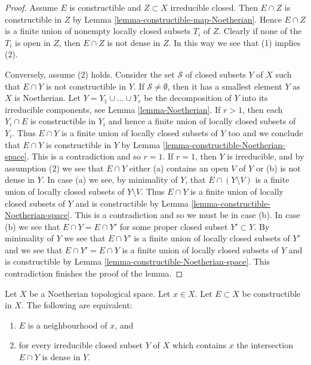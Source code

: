 \begin{proof}
Assume $E$ is constructible and $Z \subset X$ irreducible closed.
Then $E \cap Z$ is constructible in $Z$ by
Lemma \ref{lemma-constructible-map-Noetherian}.
Hence $E \cap Z$ is a finite union of nonempty locally closed subsets
$T_i$ of $Z$. Clearly if none of the $T_i$ is open in $Z$, then
$E \cap Z$ is not dense in $Z$. In this way we see that (1) implies (2).

\medskip\noindent
Conversely, assume (2) holds. Consider the set $\mathcal{S}$ of closed
subsets $Y$ of $X$ such that $E \cap Y$ is not constructible in $Y$.
If $\mathcal{S} \not = \emptyset$, then it has a smallest element $Y$
as $X$ is Noetherian.
Let $Y = Y_1 \cup \ldots \cup Y_r$ be the decomposition of $Y$ into its
irreducible components, see
Lemma \ref{lemma-Noetherian}.
If $r > 1$, then each $Y_i \cap E$ is constructible in $Y_i$ and hence
a finite union of locally closed subsets of $Y_i$. Thus $E \cap Y$
is a finite union of locally closed subsets of $Y$ too and we conclude
that $E \cap Y$ is constructible in $Y$ by
Lemma \ref{lemma-constructible-Noetherian-space}.
This is a contradiction and so $r = 1$. If $r = 1$, then $Y$ is
irreducible, and by assumption (2) we see that $E \cap Y$ either
(a) contains an open $V$ of $Y$ or (b) is not dense in $Y$.
In case (a) we see, by minimality of $Y$, that $E \cap (Y \setminus V)$
is a finite union of locally closed subsets of $Y \setminus V$. Thus
$E \cap Y$ is a finite union of locally closed subsets of $Y$ and is
constructible by
Lemma \ref{lemma-constructible-Noetherian-space}.
This is a contradiction and so we must be in case (b).
In case (b) we see that $E \cap Y = E \cap Y'$ for some proper closed
subset $Y' \subset Y$. By minimality of $Y$ we see that
$E \cap Y'$ is a finite union of locally closed subsets of $Y'$ and
we see that $E \cap Y' = E \cap Y$ is a finite union of locally closed
subsets of $Y$ and is constructible by
Lemma \ref{lemma-constructible-Noetherian-space}.
This contradiction finishes the proof of the lemma.
\end{proof}

\begin{lemma}
\label{lemma-constructible-neighbourhood-Noetherian}
Let $X$ be a Noetherian topological space.
Let $x \in X$.
Let $E \subset X$ be constructible in $X$.
The following are equivalent:
\begin{enumerate}
\item $E$ is a neighbourhood of $x$, and
\item for every irreducible closed subset $Y$ of $X$ which contains
$x$ the intersection $E \cap Y$ is dense in $Y$.
\end{enumerate}
\end{lemma}

